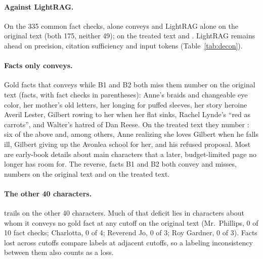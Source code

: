 \paragraph{Against LightRAG.}
On the 335 common fact checks, \sys alone conveys  and LightRAG
alone  on the original text (both 175, neither 49); on the treated
text  and . LightRAG remains ahead
on precision, citation sufficiency and input tokens (Table~\ref{tab:decon}).

\paragraph{Facts only \sys conveys.}
Gold facts that \sys conveys while B1 and B2 both miss them number  on
the original text (facts, with fact checks in parentheses): Anne's braids and changeable
eye color, her mother's old letters, her longing for puffed sleeves, her story heroine
Averil Lester, Gilbert rowing to her when her flat sinks, Rachel Lynde's ``red as
carrots'', and Walter's hatred of Dan Reese. On the treated text they number
: six of the above and, among others, Anne realizing she loves
Gilbert when he falls ill, Gilbert giving up the Avonlea school for her, and his refused
proposal. Most are
early-book details about main characters that a later, budget-limited page no longer has
room for. The reverse, facts B1 and B2 both convey and \sys misses, numbers
 on the original text and  on the treated text.

\paragraph{The other 40 characters.}
\sys trails on the other 40 characters. Much of that deficit lies in characters about whom
it conveys no gold fact at any cutoff on the original text (Mr.\ Phillips, 0 of 10 fact
checks; Charlotta, 0 of 4; Reverend Jo, 0 of 3; Roy Gardner, 0 of 3). Facts lost across
cutoffs compare labels at adjacent cutoffs, so a labeling inconsistency between them also
counts as a loss.
